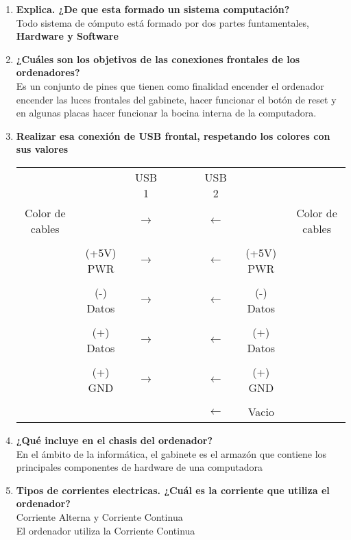 \documentclass[a4papper, 12pt]{article}
\begin{document}
	\begin{enumerate}
		\item \textbf{Explica.  ¿De que esta formado un sistema computación?}\\
			Todo sistema de cómputo está formado por dos partes funtamentales, \textbf{Hardware y Software}
		
		\item  \textbf{¿Cuáles son los objetivos de las conexiones frontales de los ordenadores?}\\
		Es un conjunto de pines que tienen como finalidad encender el ordenador encender las luces frontales del gabinete, hacer funcionar el botón de reset y en algunas placas hacer funcionar la bocina interna de la computadora.\\
		
		\item \textbf{Realizar esa conexión de USB frontal, respetando los colores con sus valores}
			\begin{table}[htbp]
				\centering
				\begin{tabular}{c c c c c c c c c}
					 &  & USB 1 &  &  &  & USB 2 &  & \\
					Color de cables &  & $\longrightarrow$ & \cellcolor{gray} &  & \cellcolor{gray} & $\longleftarrow$ &  & Color de cables \\
					& & & & & & & & \\
					 & (+5V) PWR &  $\longrightarrow$  & \cellcolor{gray} &  & \cellcolor{gray} & $\longleftarrow$ & (+5V) PWR &  \\
					& & & & & & & & \\
					 & (-) Datos & $\longrightarrow$ & \cellcolor{gray} &  & \cellcolor{gray} & $\longleftarrow$ & (-) Datos &  \\
					& & & & & & & & \\
					 & (+) Datos & $\longrightarrow$ & \cellcolor{gray} &  & \cellcolor{gray} & $\longleftarrow$ & (+) Datos &  \\
					& & & & & & & & \\
					 & (+) GND & $\longrightarrow$ & \cellcolor{gray} &  & \cellcolor{gray} & $\longleftarrow$ & (+) GND &  \\
					& & & & & & & & \\
					 &  &  &  &  & \cellcolor{gray} & $\longleftarrow$ & Vacio &  \\
				\end{tabular}
				
			\end{table}
		\clearpage
		
		
		\item \textbf{¿Qué incluye en el chasis del ordenador?}\\
		En el ámbito de la informática, el gabinete es el armazón que contiene los principales componentes de hardware de una computadora\\
		\item \textbf{Tipos de corrientes electricas.  ¿Cuál es la corriente que utiliza el ordenador?}\\
		Corriente Alterna y Corriente Continua\\
		El ordenador utiliza la Corriente Continua\\
	\end{enumerate}
		\clearpage
\end{document}
